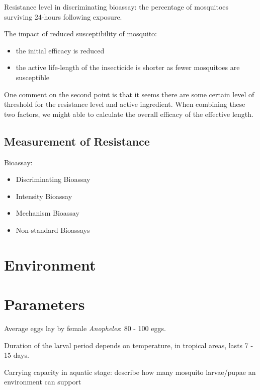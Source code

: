 \documentclass[a4paper, 12pt, twoside]{article}
\begin{document}

Resistance level in discriminating bioassay: the percentage of mosquitoes surviving 24-hours following exposure.

The impact of reduced susceptibility of mosquito:
\begin{itemize}
  \item the initial efficacy is reduced
  \item the active life-length of the insecticide is shorter as fewer mosquitoes are susceptible
\end{itemize}


One comment on the second point is that it seems there are some certain level of threshold for the resistance level and active ingredient. When combining these two factors, we might able to calculate the overall efficacy of the effective length. 

\subsection{Measurement of Resistance}

Bioassay:

\begin{itemize}
  \item Discriminating Bioassay
  \item Intensity Bioassay
  \item Mechanism Bioassay
  \item Non-standard Bioassays
\end{itemize}

\section{Environment}
\section{Parameters}

Average eggs lay by female \textit{Anopheles}: 80 - 100 eggs.

Duration of the larval period depends on temperature, in tropical areas, lasts 7 - 15 days.\cite{bayoh_lindsay_2003}

Carrying capacity in aquatic stage: describe how many mosquito larvae/pupae an environment can support
\end{document}
